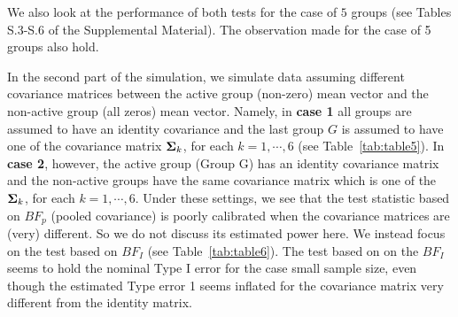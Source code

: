 \documentclass[12pt]{article}
\newcommand{\uSigma}            {\mbox{\boldmath$\Sigma$}}
\begin{document}
We also look at the performance of both tests for the case of $5$ groups (see Tables S.3-S.6 of the Supplemental Material). The observation made for the case of 5 groups also hold.

In the second part of the simulation, we simulate data assuming different covariance matrices between the active group (non-zero) mean vector and the non-active group (all zeros) mean vector. Namely, in {\bf case 1} all groups are assumed to have an identity covariance and the last group $G$ is assumed to have one of the  covariance matrix $\uSigma_k$, for each $k = 1, \cdots, 6$ (see Table~\ref{tab:table5}). 
In {\bf case 2}, however, the active group (Group G) has an identity  covariance matrix and the  non-active groups have the same covariance matrix which is one of the $\uSigma_k$, for each $k = 1, \cdots, 6$. Under these settings, we see that the test statistic based on $BF_{p}$ (pooled covariance) is poorly calibrated when the covariance matrices are (very) different. So we do not discuss its estimated power here. We instead focus on the test based on $BF_{I}$ (see Table~\ref{tab:table6}). The test based on on the $BF_{I}$ seems to hold the nominal Type I error for the case small sample size, even though the estimated Type error 1 seems inflated for the covariance matrix very different from the identity matrix.
\end{document}
